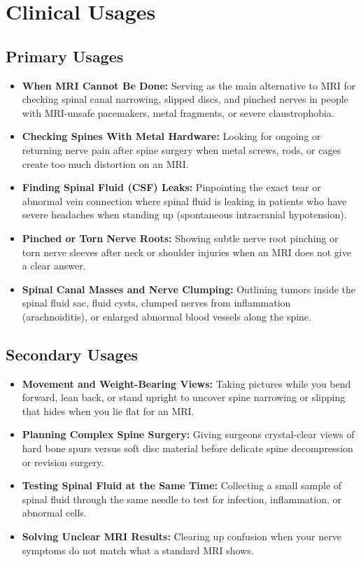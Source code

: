 \section{Clinical Usages}

\subsection{Primary Usages}
\begin{itemize}
    \item \textbf{When MRI Cannot Be Done:} Serving as the main alternative to MRI for checking spinal canal narrowing, slipped discs, and pinched nerves in people with MRI-unsafe pacemakers, metal fragments, or severe claustrophobia.
    \item \textbf{Checking Spines With Metal Hardware:} Looking for ongoing or returning nerve pain after spine surgery when metal screws, rods, or cages create too much distortion on an MRI.
    \item \textbf{Finding Spinal Fluid (CSF) Leaks:} Pinpointing the exact tear or abnormal vein connection where spinal fluid is leaking in patients who have severe headaches when standing up (spontaneous intracranial hypotension).
    \item \textbf{Pinched or Torn Nerve Roots:} Showing subtle nerve root pinching or torn nerve sleeves after neck or shoulder injuries when an MRI does not give a clear answer.
    \item \textbf{Spinal Canal Masses and Nerve Clumping:} Outlining tumors inside the spinal fluid sac, fluid cysts, clumped nerves from inflammation (arachnoiditis), or enlarged abnormal blood vessels along the spine.
\end{itemize}

\subsection{Secondary Usages}
\begin{itemize}
    \item \textbf{Movement and Weight-Bearing Views:} Taking pictures while you bend forward, lean back, or stand upright to uncover spine narrowing or slipping that hides when you lie flat for an MRI.
    \item \textbf{Planning Complex Spine Surgery:} Giving surgeons crystal-clear views of hard bone spurs versus soft disc material before delicate spine decompression or revision surgery.
    \item \textbf{Testing Spinal Fluid at the Same Time:} Collecting a small sample of spinal fluid through the same needle to test for infection, inflammation, or abnormal cells.
    \item \textbf{Solving Unclear MRI Results:} Clearing up confusion when your nerve symptoms do not match what a standard MRI shows.
\end{itemize}

